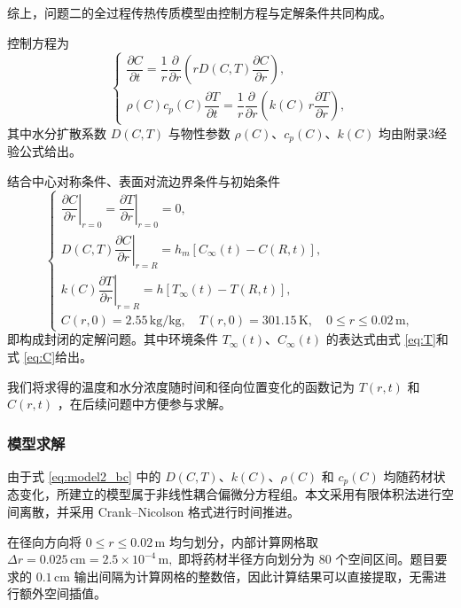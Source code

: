 \documentclass[12pt,a4paper]{article}
\begin{document}
综上，问题二的全过程传热传质模型由控制方程与定解条件共同构成。

控制方程为
\begin{equation}
\begin{cases}
\dfrac{\partial C}{\partial t}
=
\dfrac{1}{r}\dfrac{\partial}{\partial r}
\left(rD(C,T)\dfrac{\partial C}{\partial r}\right),\\[3mm]
\rho(C)c_p(C)\dfrac{\partial T}{\partial t}
=
\dfrac{1}{r}\dfrac{\partial}{\partial r}
\left(k(C)\,r\dfrac{\partial T}{\partial r}\right),
\end{cases}
\label{eq:model2_pde}
\end{equation}
其中水分扩散系数 \(D(C,T)\) 与物性参数 \(\rho(C)\)、\(c_p(C)\)、\(k(C)\) 均由附录3经验公式给出。

结合中心对称条件、表面对流边界条件与初始条件
\begin{equation}
\begin{cases}
\left.\dfrac{\partial C}{\partial r}\right|_{r=0}
=\left.\dfrac{\partial T}{\partial r}\right|_{r=0}=0,\\[3mm]
D(C,T)\left.\dfrac{\partial C}{\partial r}\right|_{r=R}
=h_m\left[C_\infty(t)-C(R,t)\right],\\[3mm]
k(C)\left.\dfrac{\partial T}{\partial r}\right|_{r=R}
=h\left[T_\infty(t)-T(R,t)\right],\\[3mm]
C(r,0)=2.55\,\mathrm{kg/kg},\quad
T(r,0)=301.15\,\mathrm{K},\quad
0\le r\le0.02\,\mathrm{m},
\end{cases}
\label{eq:model2_bc}
\end{equation}
即构成封闭的定解问题。其中环境条件 \(T_\infty(t)\)、\(C_\infty(t)\) 的表达式由式 \eqref{eq:T}和式 \eqref{eq:C}给出。

我们将求得的温度和水分浓度随时间和径向位置变化的函数记为 $T(r,t)$ 和 $C(r,t)$ ，在后续问题中方便参与求解。

\subsubsection{模型求解}

由于式 \eqref{eq:model2_bc} 中的 $D(C,T)$、$k(C)$、$\rho(C)$ 和 $c_p(C)$ 均随药材状态变化，所建立的模型属于非线性耦合偏微分方程组。本文采用有限体积法进行空间离散，并采用 Crank--Nicolson 格式进行时间推进。

在径向方向将 $0\leq r\leq0.02\,\mathrm{m}$ 均匀划分，内部计算网格取
$\Delta r=0.025\,\mathrm{cm}
=2.5\times10^{-4}\,\mathrm{m},$
即将药材半径方向划分为 $80$ 个空间区间。题目要求的 $0.1\,\mathrm{cm}$ 输出间隔为计算网格的整数倍，因此计算结果可以直接提取，无需进行额外空间插值。
\end{document}
